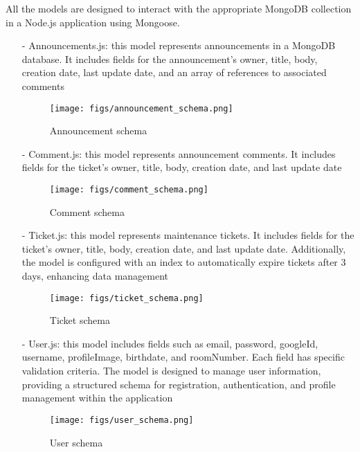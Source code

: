 \documentclass[conference]{IEEEtran}
\begin{document}
\begin{enumerate}
\begin{enumerate}
        All the models are designed to interact with the appropriate MongoDB collection in a Node.js application using Mongoose.
        \begin{itemize}
            \item[-] Announcements.js: this model represents announcements in a MongoDB database. It includes fields for the announcement's owner, title, body, creation date, last update date, and an array of references to associated comments
            \begin{figure}[H]
            \centering
            \texttt{[image: figs/announcement\_schema.png]}
            \caption{Announcement schema}
            \label{fig:Announcement Schema}
            \end{figure}
            \item[-] Comment.js: this model represents announcement comments. It includes fields for the ticket's owner, title, body, creation date, and last update date
            \begin{figure}[H]
            \centering
            \texttt{[image: figs/comment\_schema.png]}
            \caption{Comment schema}
            \label{fig:Comment Schema}
            \end{figure}
            \item[-] Ticket.js: this model represents maintenance tickets. It includes fields for the ticket's owner, title, body, creation date, and last update date. Additionally, the model is configured with an index to automatically expire tickets after 3 days, enhancing data management
            \begin{figure}[H]
            \centering
            \texttt{[image: figs/ticket\_schema.png]}
            \caption{Ticket schema}
            \label{fig:Ticket Schema}
            \end{figure}
            \item[-] User.js: this model includes fields such as email, password, googleId, username, profileImage, birthdate, and roomNumber. Each field has specific validation criteria. The model is designed to manage user information, providing a structured schema for registration, authentication, and profile management within the application
            \begin{figure}[H]
            \centering
            \texttt{[image: figs/user\_schema.png]}
            \caption{User schema}
            \label{fig:User Schema}
            \end{figure}

\end{itemize}
\end{enumerate}
\end{enumerate}
\end{document}
